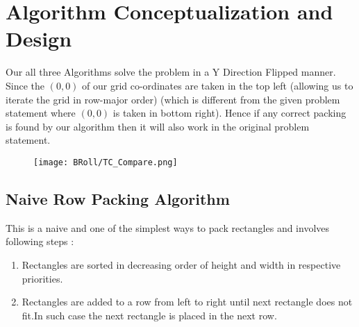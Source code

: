 \documentclass[12pt, a4paper,openany]{article}
\begin{document}
\section{Algorithm Conceptualization and Design}
\begin{flushleft}
Our all three Algorithms solve the problem in a Y Direction Flipped manner.
Since the \((0,0)\) of our grid co-ordinates are taken in the top left (allowing us to iterate the grid in row-major order)
(which is different from the given problem statement where \((0,0)\) is taken in bottom right). Hence if any
correct packing is found by our algorithm then it will also work in the original problem statement.
\end{flushleft}
\begin{figure}[ht]
  \centering
  \texttt{[image: BRoll/TC\_Compare.png]}
  \label{fig:TC_Compare}
\end{figure}

\newpage %
\subsection{Naive Row Packing Algorithm}
\begin{flushleft}
This is a naive and one of the simplest ways to pack rectangles and involves following steps :
\begin{enumerate}
    \item Rectangles are sorted in decreasing order of height and width in respective priorities.
    \item Rectangles are added to a row from left to right until next rectangle does not fit.In such case the next rectangle is placed in the next row.
\end{enumerate}
\end{flushleft}
\end{document}

